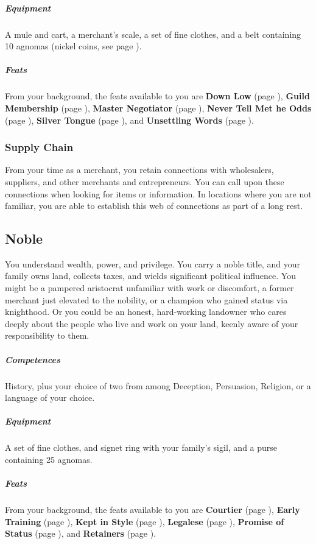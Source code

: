     \subparagraph{Equipment} A mule and cart, a merchant's scale, a set of fine clothes, and a belt containing 10 agnomas (nickel coins, see page \pageref{sec::currency}).

    \subparagraph{Feats} From your background, the feats available to you are
    \textbf{Down Low} (page \pageref{feat::downlow}),
    \textbf{Guild Membership} (page \pageref{feat::guildmembership}),
    \textbf{Master Negotiator} (page \pageref{feat::masternegotiator}),
    \textbf{Never Tell Met he Odds} (page \pageref{feat::nevertellmetheodds}),
    \textbf{Silver Tongue} (page \pageref{feat::silvertongue}), and
    \textbf{Unsettling Words} (page \pageref{feat::unsettlingwords}).

    \subsubsection{Supply Chain} \label{feat::supplychain}
        From your time as a merchant, you retain connections with wholesalers, suppliers, and other merchants and entrepreneurs.
        You can call upon these connections when looking for items or information.
        In locations where you are not familiar, you are able to establish this web of connections as part of a long rest.

\subsection*{Noble} \label{ssec::noble}
    You understand wealth, power, and privilege.
    You carry a noble title, and your family owns land, collects taxes, and wields significant political influence.
    You might be a pampered aristocrat unfamiliar with work or discomfort, a former merchant just elevated to the nobility, or a champion who gained status via knighthood.
    Or you could be an honest, hard-working landowner who cares deeply about the people who live and work on your land, keenly aware of your responsibility to them.

    \subparagraph{Competences} History, plus your choice of two from among Deception, Persuasion, Religion, or a language of your choice.

    \subparagraph{Equipment} A set of fine clothes, and signet ring with your family's sigil, and a purse containing 25 agnomas.

    \subparagraph{Feats} From your background, the feats available to you are
    \textbf{Courtier} (page \pageref{feat::courtier}),
    \textbf{Early Training} (page \pageref{feat::earlytraining}),
    \textbf{Kept in Style} (page \pageref{feat::keptinstyle}),
    \textbf{Legalese} (page \pageref{feat::legalese}),
    \textbf{Promise of Status} (page \pageref{feat::promiseofstatus}), and
    \textbf{Retainers} (page \pageref{feat::retainers}).

